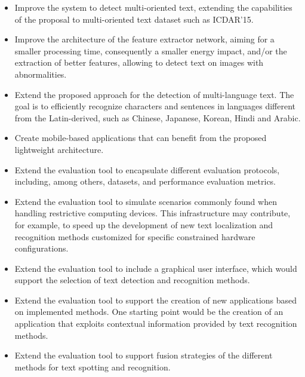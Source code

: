 \begin{itemize}
    \item Improve the system to detect multi-oriented text, extending the capabilities of the proposal to multi-oriented text dataset such as ICDAR'15.
    
    \item Improve the architecture of the feature extractor network, aiming for a smaller processing time, consequently a smaller energy impact, and/or the extraction of better features, allowing to detect text on images with abnormalities.
    
    \item Extend the proposed approach for the detection of multi-language text. The goal is to efficiently recognize characters and sentences in languages different from the Latin-derived, such as Chinese, Japanese, Korean, Hindi and Arabic. 
    
    \item Create mobile-based applications that can benefit from the proposed lightweight architecture.
    
    \item Extend the evaluation tool to encapsulate different evaluation protocols, including, among others, datasets, and performance evaluation metrics. 
    
    \item Extend the evaluation tool to simulate scenarios commonly found when handling restrictive computing devices. This infrastructure may contribute, for example, to speed up the development of new text localization and recognition methods customized for specific constrained hardware configurations.
    
    \item Extend the evaluation tool to include a graphical user interface, which would support the selection of text detection and recognition methods.
    
    \item Extend the evaluation tool to support the creation of new applications based on implemented methods. One starting point would be the creation of an application that exploits contextual information provided by text recognition methods.
    
    \item Extend the evaluation tool to support fusion strategies of the different methods for text spotting and recognition.
    
\end{itemize}

